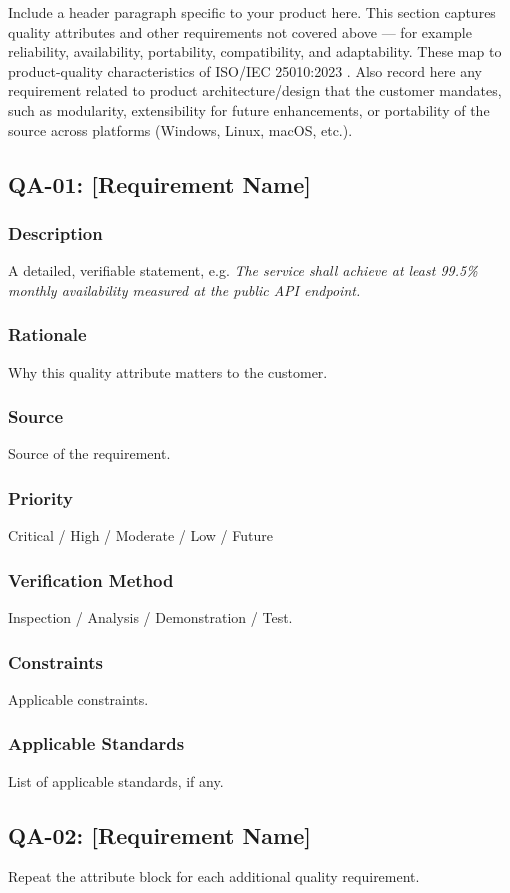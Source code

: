 Include a header paragraph specific to your product here. This section captures quality attributes and other requirements not covered above --- for example reliability, availability, portability, compatibility, and adaptability. These map to product-quality characteristics of ISO/IEC 25010:2023 \cite{ISO25010}. Also record here any requirement related to product architecture/design that the customer mandates, such as modularity, extensibility for future enhancements, or portability of the source across platforms (Windows, Linux, macOS, etc.).

\subsection{QA-01: [Requirement Name]}
\subsubsection{Description}
A detailed, verifiable statement, e.g. \textit{The service shall achieve at least 99.5\% monthly availability measured at the public API endpoint.}
\subsubsection{Rationale}
Why this quality attribute matters to the customer.
\subsubsection{Source}
Source of the requirement.
\subsubsection{Priority}
Critical / High / Moderate / Low / Future
\subsubsection{Verification Method}
Inspection / Analysis / Demonstration / Test.
\subsubsection{Constraints}
Applicable constraints.
\subsubsection{Applicable Standards}
List of applicable standards, if any.

\subsection{QA-02: [Requirement Name]}
Repeat the attribute block for each additional quality requirement.

